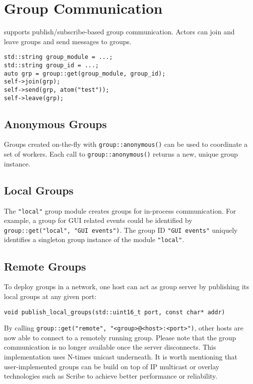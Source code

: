 \section{Group Communication}
\label{Sec::Group}

\lib supports publish/subscribe-based group communication.
Actors can join and leave groups and send messages to groups.

\begin{lstlisting}
std::string group_module = ...;
std::string group_id = ...;
auto grp = group::get(group_module, group_id);
self->join(grp);
self->send(grp, atom("test"));
self->leave(grp);
\end{lstlisting}

\subsection{Anonymous Groups}
\label{Sec::Group::Anonymous}

Groups created on-the-fly with \lstinline^group::anonymous()^ can be used to coordinate a set of workers.
Each call to \lstinline^group::anonymous()^ returns a new, unique group instance.

\subsection{Local Groups}
\label{Sec::Group::Local}

The \lstinline^"local"^ group module creates groups for in-process communication.
For example, a group for GUI related events could be identified by \lstinline^group::get("local", "GUI events")^.
The group ID \lstinline^"GUI events"^ uniquely identifies a singleton group instance of the module \lstinline^"local"^.

\subsection{Remote Groups}
\label{Sec::Group::RemoteGroups}

To deploy groups in a network, one host can act as group server by publishing its local groups at any given port:

\begin{lstlisting}
void publish_local_groups(std::uint16_t port, const char* addr)
\end{lstlisting}

By calling \lstinline^group::get("remote", "<group>@<host>:<port>")^, other hosts are now able to connect to a remotely running group.
Please note that the group communication is no longer available once the server disconnects.
This implementation uses N-times unicast underneath.
It is worth mentioning that user-implemented groups can be build on top of IP multicast or overlay technologies such as Scribe to achieve better performance or reliability.

